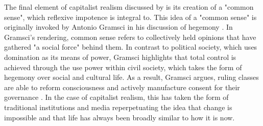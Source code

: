 The final element of capitalist realism discussed by \citet{shonkwiler_reading_2014} is its creation of a "common sense", which reflexive impotence is integral to. This idea of a "common sense" is originally invoked by Antonio Gramsci in his discussion of hegemony \citep{gramsci_selections_2007}. In Gramsci's rendering, common sense refers to collectively held opinions that have gathered "a social force" behind them. In contrast to political society, which uses domination as its means of power, Gramsci highlights that total control is achieved through the use power within civil society, which takes the form of hegemony over social and cultural life. As a result, Gramsci argues, ruling classes are able to reform consciousness \citep[]{gramsci_selections_2007} and actively manufacture consent for their governance \citep[39]{harvey_brief_2007}. In the case of capitalist realism, this has taken the form of traditional institutions and media reperpetuating the idea that change is impossible and that life has always been broadly similar to how it is now. 

